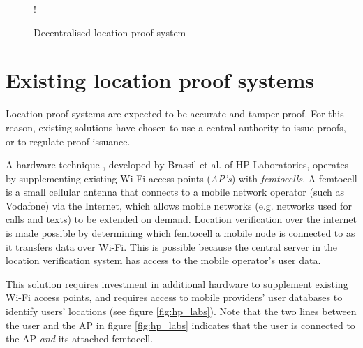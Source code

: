 \begin{figure}[H]
\begin{center}
 {!} {}
\end{center}
\caption{Decentralised location proof system}
\label{fig:decentralised_location}
\end{figure}

\section{Existing location proof systems} \label{ssec:proof_systems}
Location proof systems are expected to be accurate and tamper-proof. For this reason, existing solutions \cite{brassil, luo, khan} have chosen to use a central authority to issue proofs, or to regulate proof issuance.

A hardware technique \cite{brassil}, developed by Brassil et al. of HP Laboratories, operates by supplementing existing Wi-Fi access points (\textit{AP's}) with \textit{femtocells}. A femtocell \cite{femtocell} is a small cellular antenna that connects to a mobile network operator (such as Vodafone) via the Internet, which allows mobile networks (e.g. networks used for calls and texts) to be extended on demand. Location verification over the internet is made possible by determining which femtocell a mobile node is connected to as it transfers data over Wi-Fi. This is possible because the central server in the location verification system has access to the mobile operator's user data.

This solution requires investment in additional hardware to supplement existing Wi-Fi access points, and requires access to mobile providers' user databases to identify users' locations (see figure \ref{fig:hp_labs}). Note that the two lines between the user and the AP in figure \ref{fig:hp_labs} indicates that the user is connected to the AP \textit{and} its attached femtocell.

